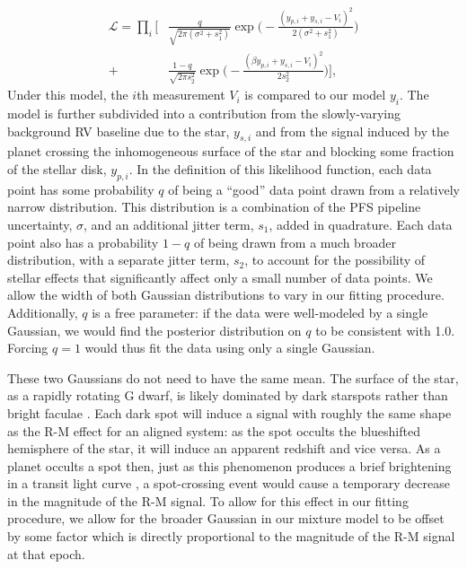 \documentclass[twocolumn]{aastex63}
\begin{document}
\begin{equation}
\begin{split}
\mathcal{L} = \prod_i \bigg[ & \frac{q}{\sqrt{2\pi (\sigma^2 + s_1^2)}} \exp\bigg(-\frac{(y_{p,i} + y_{s,i}-V_i)^2}{2(\sigma^2 + s_1^2)}\bigg)  \\+ & \frac{1-q}{\sqrt{2\pi s_2^2}} \exp\bigg(-\frac{(\beta y_{p,i} + y_{s,i}-V_i)^2}{2s_2^2}\bigg) \bigg],
\end{split}
\end{equation}
Under this model, the $i$th measurement $V_i$ is compared to our model $y_i$. The model is further subdivided into a contribution from the slowly-varying background RV baseline due to the star, $y_{s,i}$ and from the signal induced by the planet crossing the inhomogeneous surface of the star and blocking some fraction of the stellar disk, $y_{p,i}$. In the definition of this likelihood function, each data point has some probability $q$ of being a ``good'' data point drawn from a relatively narrow distribution. This distribution is a combination of the PFS pipeline uncertainty, $\sigma$, and an additional jitter term, $s_1$, added in quadrature. 
Each data point also has a probability $1-q$ of being drawn from a much broader distribution, with a separate jitter term, $s_2$, to account for the possibility of stellar effects that significantly affect only a small number of data points. We allow the width of both Gaussian distributions to vary in our fitting procedure. 
Additionally, $q$ is a free parameter: if the data were well-modeled by a single Gaussian, we would find the posterior distribution on $q$ to be consistent with 1.0.
Forcing $q=1$ would thus fit the data using only a single Gaussian.

These two Gaussians do not need to have the same mean. 
The surface of the star, as a rapidly rotating G dwarf, is likely dominated by dark starspots rather than bright faculae \citep{Montet17}. 
Each dark spot will induce a signal with roughly the same shape as the R-M effect for an aligned system: as the spot occults the blueshifted hemisphere of the star, it will induce an apparent redshift and vice versa.
As a planet occults a spot then, just as this phenomenon produces a brief brightening in a transit light curve \citep{Desert11, SanchisOjeda13, Morris17}, a spot-crossing event would cause a temporary decrease in the magnitude of the R-M signal. 
To allow for this effect in our fitting procedure, we allow for the broader Gaussian in our mixture model to be offset by some factor which is directly proportional to the magnitude of the R-M signal at that epoch. 
\end{document}
